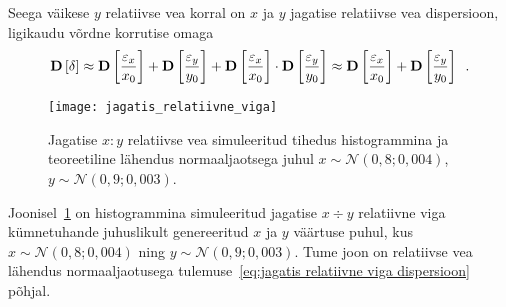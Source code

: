 Seega väikese $y$ relatiivse vea korral on $x$ ja $y$ jagatise relatiivse vea dispersioon, ligikaudu võrdne korrutise omaga
\begin{equation}
    \label{eq:jagatis relatiivne viga dispersioon}
    \operatorname*{\mathbf{D}}\left[\delta\right] \approx \operatorname*{\mathbf{D}}\left[\frac{\varepsilon_x}{x_0}\right] + \operatorname*{\mathbf{D}}\left[\frac{\varepsilon_y}{y_0}\right] + \operatorname*{\mathbf{D}}\left[\frac{\varepsilon_x}{x_0}\right] \cdot \operatorname*{\mathbf{D}}\left[\frac{\varepsilon_y}{y_0}\right] \approx \operatorname*{\mathbf{D}}\left[\frac{\varepsilon_x}{x_0}\right] + \operatorname*{\mathbf{D}}\left[\frac{\varepsilon_y}{y_0}\right] \enspace.
\end{equation}

\begin{figure}[H]
    \begin{center}
        \texttt{[image: jagatis\_relatiivne\_viga]}
    \end{center}
    \caption{Jagatise $x:y$ relatiivse vea simuleeritud tihedus histogrammina ja teoreetiline lähendus normaaljaotsega juhul $x \sim \mathcal{N}(0{,}8; 0{,}004)$, $y \sim \mathcal{N}(0{,}9; 0{,}003)$.}
    \label{fig:jagatis relatiivne viga tihedus}
\end{figure}

Joonisel~\ref{fig:jagatis relatiivne viga tihedus} on histogrammina simuleeritud jagatise $x \div y$ relatiivne viga kümnetuhande juhuslikult genereeritud $x$ ja $y$ väärtuse puhul, kus $x \sim \mathcal{N}(0{,}8; 0{,}004)$ ning $y \sim \mathcal{N}(0{,}9; 0{,}003)$. Tume joon on  relatiivse vea lähendus normaaljaotusega tulemuse~\eqref{eq:jagatis relatiivne viga dispersioon} põhjal.